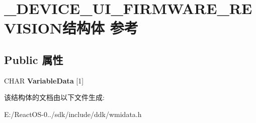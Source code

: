 \hypertarget{struct___d_e_v_i_c_e___u_i___f_i_r_m_w_a_r_e___r_e_v_i_s_i_o_n}{}\section{\+\_\+\+D\+E\+V\+I\+C\+E\+\_\+\+U\+I\+\_\+\+F\+I\+R\+M\+W\+A\+R\+E\+\_\+\+R\+E\+V\+I\+S\+I\+O\+N结构体 参考}
\label{struct___d_e_v_i_c_e___u_i___f_i_r_m_w_a_r_e___r_e_v_i_s_i_o_n}
\subsection*{Public 属性}
\begin{DoxyCompactItemize}
\item 
\mbox{\label{struct___d_e_v_i_c_e___u_i___f_i_r_m_w_a_r_e___r_e_v_i_s_i_o_n_a7a0b8b67e269162bade5ca007b1b16b2}} 
C\+H\+AR {\bfseries Variable\+Data} \mbox{[}1\mbox{]}
\end{DoxyCompactItemize}


该结构体的文档由以下文件生成\+:\begin{DoxyCompactItemize}
\item 
E\+:/\+React\+O\+S-\/0../sdk/include/ddk/wmidata.\+h\end{DoxyCompactItemize}
